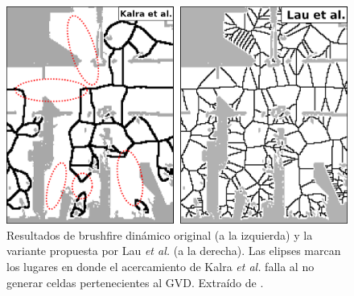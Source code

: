 \begin{figure}[H]
  \center
  \includegraphics[width=0.75\linewidth]{imagenes/lauPalo.png}
  \caption[Resultados de brushfire dinámico original y la variante propuesta por Lau \textit{et al.}]{Resultados de brushfire dinámico original (a la izquierda) y la variante propuesta por Lau \textit{et al.} (a la derecha). Las elipses marcan los lugares en donde el acercamiento de Kalra \textit{et al.} falla al no generar celdas pertenecientes al GVD. Extraído de \cite{Lau2013}.}\label{fig:lauPalo}
\end{figure} 



